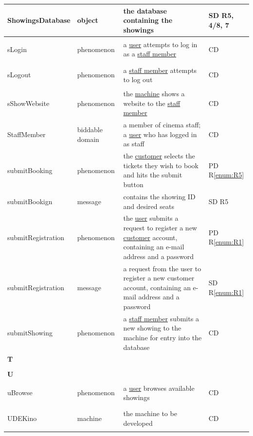 \documentclass[a4paper,10pt,titlepage,bibtotoc,bibtotocnumbered]{scrreprt}
\begin{document}
\begin{longtable}{|l|p{3cm}|p{5cm}|l|}
\hline
ShowingsDatabase & object & the database containing the showings & SD R5, 4/8, 7\\
\hline
\hypertarget{glossary:sLogin}{sLogin} & phenomenon & a \hyperlink{glossary:User}{user} attempts to log in as a \hyperlink{glossary:StaffMember}{staff member} & CD\\
\hline
\hypertarget{glossary:sLogout}{sLogout} & phenomenon & a \hyperlink{glossary:StaffMember}{staff member} attempts to log out & CD\\
\hline
\hypertarget{glossary:sShowWebsite}{sShowWebsite} & phenomenon & the \hyperlink{glossary:UDEKino}{machine} shows a website to the \hyperlink{glossary:StaffMember}{staff member} & CD\\
\hline
\hypertarget{glossary:StaffMember}{StaffMember} & biddable domain & a member of cinema staff; a \hyperlink{glossary:User}{user} who has logged in as staff & CD\\
\hline
\hypertarget{glossary:submitBooking}{submitBooking} & phenomenon & the \hyperlink{glossary:Customer}{customer} selects the tickets they wish to book and hits the submit button &  PD R\ref{enum:R5}\\
\hline
submitBookign & message & contains the showing ID and desired seats & SD R5\\
\hline
\hypertarget{glossary:submitRegistration}{submitRegistration} & phenomenon & the \hyperlink{glossary:User}{user} submits a request to register a new \hyperlink{glossary:Customer}{customer} account, containing an e-mail address and a password & PD R\ref{enum:R1}\\
\hline
\hline
submitRegistration & message & a request from the user to register a new customer account, containing an e-mail address and a password & SD R\ref{enum:R1}\\
\hline
\hypertarget{glossary:submitShowing}{submitShowing} & phenomenon & a \hyperlink{glossary:StaffMember}{staff member} submits a new showing to the machine for entry into the database & CD\\
\hline
\multicolumn{4}{|l|}{\textbf{T}}\\
\hline
&  &  & \\
\hline
\multicolumn{4}{|l|}{\textbf{U}}\\
\hline
\hypertarget{glossary:uBrowse}{uBrowse} & phenomenon & a \hyperlink{glossary:User}{user} browses available showings & CD\\
\hline
\hypertarget{glossary:UDEKino}{UDEKino} & machine & the machine to be developed & CD\\

\end{longtable}
\end{document}
